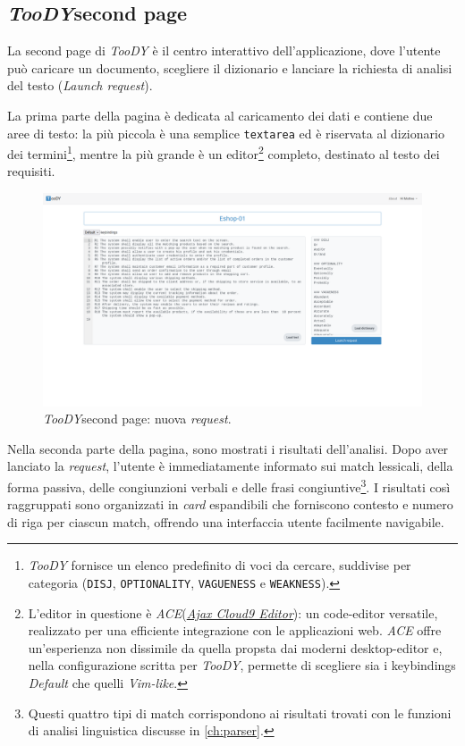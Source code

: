 \documentclass[12pt]{report}
\newcommand{\toody}{\textsl{TooDY}\xspace}
\newcommand{\ace}{\textsl{ACE}\xspace}
\begin{document}
\subsection{\toody \textsf{second page}}
\label{sec:second-page}
La \textsf{second page} di \toody è il centro interattivo dell'applicazione, dove l'utente può caricare un documento, scegliere il dizionario e lanciare la richiesta di analisi del testo (\textit{Launch request}).

La prima parte della pagina è dedicata al caricamento dei dati e contiene due aree di testo: la più piccola è una semplice \texttt{textarea} ed è riservata al dizionario dei termini\footnote{\toody fornisce un elenco predefinito di voci da cercare, suddivise per categoria (\texttt{DISJ}, \texttt{OPTIONALITY}, \texttt{VAGUENESS} e \texttt{WEAKNESS}).}, mentre la più grande è un editor\footnote{L'editor in questione è \ace (\href{https://ace.c9.io/}{\textit{Ajax Cloud9 Editor}}): un code-editor versatile, realizzato per una efficiente integrazione con le applicazioni web. \ace offre un'esperienza non dissimile da quella propsta dai moderni desktop-editor e, nella configurazione scritta per \toody, permette di scegliere sia i keybindings \textsl{Default} che quelli \textsl{Vim-like}.} completo, destinato al testo dei requisiti.

\begin{figure}[H]
\centering
\includegraphics[width=1.0\textwidth]{pagina2-vuota.png}
\caption{\toody \textsf{second page}: nuova \textit{request}.}
\label{fig:pagina1-login}
\end{figure}

Nella seconda parte della pagina, sono mostrati i risultati dell'analisi. Dopo aver lanciato la \textit{request}, l'utente è immediatamente informato sui match lessicali, della forma passiva, delle congiunzioni verbali e delle frasi congiuntive\footnote{Questi quattro tipi di match corrispondono ai risultati trovati con le funzioni di analisi linguistica discusse in \cref{ch:parser}.}. I risultati così raggruppati sono organizzati in \textit{card} espandibili che forniscono contesto e numero di riga per ciascun match, offrendo una interfaccia utente facilmente navigabile.
\end{document}
